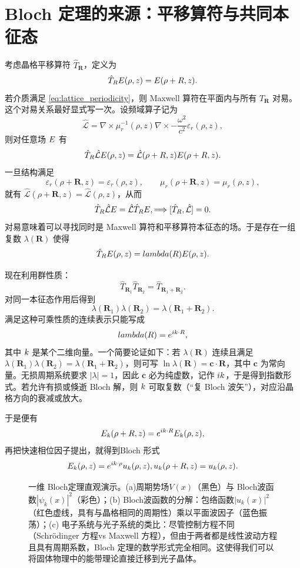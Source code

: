 \section{Bloch 定理的来源：平移算符与共同本征态}
考虑晶格平移算符 $\hat T_{\bm{R}}$，定义为
\[
\hat T_{R}E(\rho,z)=E(\rho+R,z).
\]
若介质满足 \cref{eq:lattice_periodicity}，则 Maxwell 算符在平面内与所有 $\hat T_{\bm{R}}$ 对易。这个对易关系最好显式写一次。设频域算子记为
\[
\hat{\mathcal L}
=
\nabla\times \mu_r^{-1}(\rho,z)\nabla\times
-\frac{\omega^2}{c^2}\varepsilon_r(\rho,z),
\]
则对任意场 $E$ 有
\[
\hat T_{R}\hat{\mathcal L}E(\rho,z)
=
\hat{\mathcal L}(\rho+R,z)E(\rho+R,z).
\]
一旦结构满足
\[
\varepsilon_r(\rho+\bm R,z)=\varepsilon_r(\rho,z),
\qquad
\mu_r(\rho+\bm R,z)=\mu_r(\rho,z),
\]
就有 $\hat{\mathcal L}(\rho+\bm R,z)=\hat{\mathcal L}(\rho,z)$，从而
\[
\hat T_{R}\hat{\mathcal L}E
=
\hat{\mathcal L}\hat T_{R}E,
\Longrightarrow
[\hat T_{R},\hat{\mathcal L}]=0.
\]
对易意味着可以寻找同时是 Maxwell 算符和平移算符本征态的场。于是存在一组复数 $\lambda(\bm{R})$ 使得
\[
\hat T_{R}E(\rho,z)=lambda(R)E(\rho,z).
\]

现在利用群性质：
\[
\hat T_{\bm{R}_1}\hat T_{\bm{R}_2}=\hat T_{\bm{R}_1+\bm{R}_2}.
\]
对同一本征态作用后得到
\[
\lambda(\bm{R}_1)\lambda(\bm{R}_2)=\lambda(\bm{R}_1+\bm{R}_2).
\]
满足这种可乘性质的连续表示只能写成
\[
lambda(R)=e^{ik\cdot R},
\]
其中 $k$ 是某个二维向量。一个简要论证如下：若 $\lambda(\bm{R})$ 连续且满足 $\lambda(\bm{R}_1)\lambda(\bm{R}_2)=\lambda(\bm{R}_1+\bm{R}_2)$，则可写 $\ln\lambda(\bm{R})=\bm{c}\cdot\bm{R}$，其中 $\bm{c}$ 为常向量。无损周期系统要求 $|\lambda|=1$，因此 $\bm{c}$ 必为纯虚数，记作 $ik$，于是得到指数形式。若允许有损或倏逝 Bloch 解，则 $k$ 可取复数（“复 Bloch 波矢”），对应沿晶格方向的衰减或放大。

于是便有
\begin{equation}
E_{k}(\rho+R,z)=e^{ik\cdot R}E_{k}(\rho,z),
\label{eq:bloch_condition}
\end{equation}
再把快速相位因子提出，就得到Bloch 形式
\begin{equation}
\E_{\kvec}(\rho,z)=\ee^{\ii\kvec\cdot\rho}\bm{u}_{\kvec}(\rho,z),
\qquad
\bm{u}_{\kvec}(\rho+\bm{R},z)=\bm{u}_{\kvec}(\rho,z).
\label{eq:bloch_form}
\end{equation}

\begin{figure}[htbp]
  \centering
  
  \caption{一维 Bloch定理直观演示。(a)周期势场$V(x)$（黑色）与 Bloch波函数$|\psi_k(x)|^2$（彩色）；(b) Bloch波函数的分解：包络函数$|u_k(x)|^2$（红色虚线，具有与晶格相同的周期性）乘以平面波因子（蓝色振荡）；(c) 电子系统与光子系统的类比：尽管控制方程不同（Schrödinger 方程vs Maxwell 方程），但由于两者都是线性波动方程且具有周期系数，Bloch 定理的数学形式完全相同。这使得我们可以将固体物理中的能带理论直接迁移到光子晶体。}
  \label{fig:ch04_bloch_1d_demo}
\end{figure}

